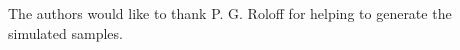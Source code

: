 \documentclass[a4paper,11pt]{article}
\begin{document}









\acknowledgments

The authors would like to thank P. G. Roloff for helping to generate the simulated samples. 

\end{document}
